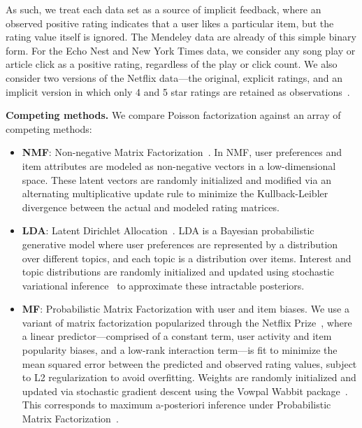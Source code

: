 As such, we treat each data set as a source of implicit feedback,
where an observed positive rating indicates that a user likes a
particular item, but the rating value itself is ignored. The Mendeley
data are already of this simple binary form. For the Echo Nest and New
York Times data, we consider any song play or article click as a
positive rating, regardless of the play or click count. We also
consider two versions of the Netflix data---the original, explicit
ratings, and an implicit version in which only 4 and 5 star ratings
are retained as observations~\cite{Paquet:2013p9197}.


{\bf Competing methods.} We compare Poisson factorization against an array of
competing methods:
\begin{itemize}
  \item {\bf NMF}: Non-negative Matrix
    Factorization~\cite{Lee:1999}. In NMF, user preferences and item
    attributes are modeled as non-negative vectors in a
    low-dimensional space. These latent vectors are randomly
    initialized and modified via an alternating multiplicative update
    rule to minimize the Kullback-Leibler divergence between the
    actual and modeled rating matrices.

  \item {\bf LDA}: Latent Dirichlet Allocation~\cite{Blei:2003b}. LDA
    is a Bayesian probabilistic generative model where user preferences
    are represented by a distribution over different topics, and each
    topic is a distribution over items. Interest and topic
    distributions are randomly initialized and updated using
    stochastic variational inference~\cite{Hoffman:2010a} to
    approximate these intractable posteriors.

  \item {\bf MF}: Probabilistic Matrix Factorization with
    user and item biases. We use a variant of matrix factorization
    popularized through the Netflix Prize~\cite{Koren:2009}, where a
    linear predictor---comprised of a constant term, user activity and
    item popularity biases, and a low-rank interaction term---is fit
    to minimize the mean squared error between the predicted and
    observed rating values, subject to L2 regularization to avoid
    overfitting. Weights are randomly initialized and updated via
    stochastic gradient descent using the Vowpal Wabbit
    package~\cite{Weinberger:2009}. This corresponds to maximum
    a-posteriori inference under Probabilistic Matrix
    Factorization~\cite{Salakhutdinov:2008a}.
\end{itemize}

